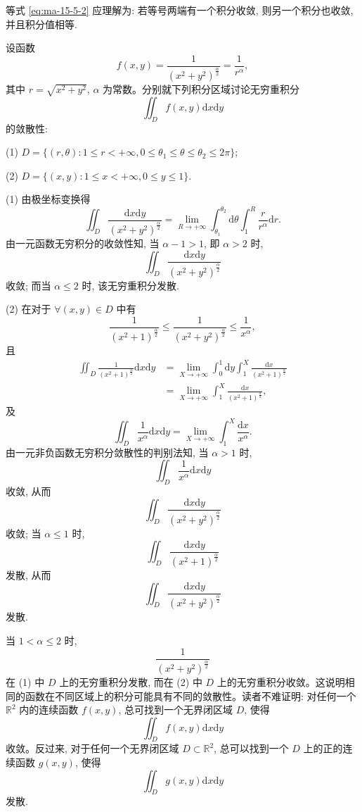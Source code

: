 \begin{remark}\label{remark:ma-15-source-79}
等式 \eqref{eq:ma-15-5-2} 应理解为: 若等号两端有一个积分收敛, 则另一个积分也收敛, 并且积分值相等.
\end{remark}


\begin{example}\label{example:ma-15-5-3}
设函数
\[
  f(x,y)=\frac1{(x^2+y^2)^{\frac\alpha2}}=\frac1{r^\alpha},
\]
其中 $r=\sqrt{x^2+y^2}$, $\alpha$ 为常数。分别就下列积分区域讨论无穷重积分
\[
  \iint_D f(x,y)\mathrm dx\mathrm dy
\]
的敛散性:

(1) $D=\{(r,\theta):1\leqslant r<+\infty,0\leqslant\theta_1\leqslant\theta\leqslant\theta_2\leqslant2\pi\}$;

(2) $D=\{(x,y):1\leqslant x<+\infty,0\leqslant y\leqslant1\}$.
\end{example}


\begin{solve}
(1) 由极坐标变换得
\[
  \iint_D\frac{\mathrm dx\mathrm dy}{(x^2+y^2)^{\frac\alpha2}}
  =\lim_{R\to+\infty}\int_{\theta_1}^{\theta_2}\mathrm d\theta
  \int_1^R\frac r{r^\alpha}\mathrm dr.
\]
由一元函数无穷积分的收敛性知, 当 $\alpha-1>1$, 即 $\alpha>2$ 时,
\[
  \iint_D\frac{\mathrm dx\mathrm dy}{(x^2+y^2)^{\frac\alpha2}}
\]
收敛; 而当 $\alpha\leqslant2$ 时, 该无穷重积分发散.

(2) 在对于 $\forall(x,y)\in D$ 中有
\[
  \frac1{(x^2+1)^{\frac\alpha2}}\leqslant
  \frac1{(x^2+y^2)^{\frac\alpha2}}\leqslant\frac1{x^\alpha},
\]
且
\[
\begin{aligned}
  \iint_D\frac1{(x^2+1)^{\frac\alpha2}}\mathrm dx\mathrm dy
  &=\lim_{X\to+\infty}\int_0^1\mathrm dy\int_1^X
  \frac{\mathrm dx}{(x^2+1)^{\frac\alpha2}}\\
  &=\lim_{X\to+\infty}\int_1^X
  \frac{\mathrm dx}{(x^2+1)^{\frac\alpha2}},
\end{aligned}
\]
及
\[
  \iint_D\frac1{x^\alpha}\mathrm dx\mathrm dy
  =\lim_{X\to+\infty}\int_1^X\frac{\mathrm dx}{x^\alpha}.
\]
由一元非负函数无穷积分敛散性的判别法知, 当 $\alpha>1$ 时,
\[
  \iint_D\frac1{x^\alpha}\mathrm dx\mathrm dy
\]
收敛, 从而
\[
  \iint_D\frac{\mathrm dx\mathrm dy}{(x^2+y^2)^{\frac\alpha2}}
\]
收敛; 当 $\alpha\leqslant1$ 时,
\[
  \iint_D\frac{\mathrm dx\mathrm dy}{(x^2+1)^{\frac\alpha2}}
\]
发散, 从而
\[
  \iint_D\frac{\mathrm dx\mathrm dy}{(x^2+y^2)^{\frac\alpha2}}
\]
发散.
\end{solve}


\begin{remark}\label{remark:ma-15-source-82}
当 $1<\alpha\leqslant2$ 时,
\[
  \frac1{(x^2+y^2)^{\frac\alpha2}}
\]
在 (1) 中 $D$ 上的无穷重积分发散, 而在 (2) 中 $D$ 上的无穷重积分收敛。这说明相同的函数在不同区域上的积分可能具有不同的敛散性。读者不难证明: 对任何一个 $\mathbb R^2$ 内的连续函数 $f(x,y)$, 总可找到一个无界闭区域 $D$, 使得
\[
  \iint_D f(x,y)\mathrm dx\mathrm dy
\]
收敛。反过来, 对于任何一个无界闭区域 $D\subset\mathbb R^2$, 总可以找到一个 $D$ 上的正的连续函数 $g(x,y)$, 使得
\[
  \iint_D g(x,y)\mathrm dx\mathrm dy
\]
发散.
\end{remark}


